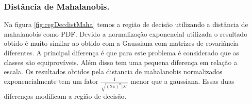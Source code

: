 \documentclass[ 
	article,			%
	11pt,				%
	oneside,			%
	a4paper,			%
	english,			%
	brazil,				%
	]{abntex2}
\begin{document}
\subsubsection{ Distância de Mahalanobis.}
Na figura \ref{fig:regDecdistMaha} temos a região de decisão utilizando a
distância de mahalanobis como PDF. Devido a normalização exponencial utilizada o
resultado obtido é muito similar ao obtido com a Gaussiana com matrizes de
covariância diferentes. A principal diferença é que para este problema é
considerado que as classes são equiprováveis. Além disso tem uma pequena
diferença em relação a escala. Os resultados obtidos pela distancia de
mahalanobis normalizados exponencialmente tem um fator
$\frac{1}{ \sqrt{ (2   \pi)^k   |\Sigma| }   }$ menor que a gaussiana. Essas
duas diferenças modificam a região de decisão.
% 
% 
% 
\end{document}
